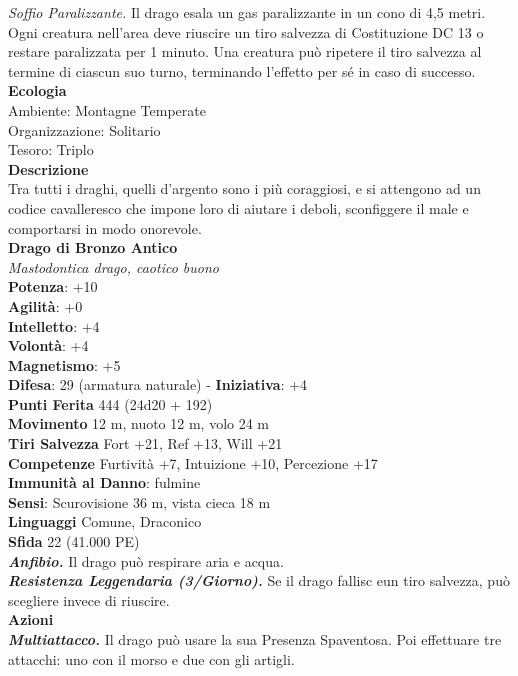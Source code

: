 \begin{multicols}{2}
\emph{Soffio Paralizzante.} Il drago esala un gas paralizzante in un cono di 4,5 metri. Ogni creatura nell'area deve riuscire un tiro salvezza di Costituzione DC 13 o restare paralizzata per 1 minuto. Una creatura può ripetere il tiro salvezza al termine di ciascun suo turno, terminando l'effetto per sé in caso di successo.\\
\textbf{Ecologia}\\
Ambiente: Montagne Temperate\\
Organizzazione: Solitario\\
Tesoro: Triplo\\
\textbf{Descrizione}\\
Tra tutti i draghi, quelli d’argento sono i più coraggiosi, e si attengono ad un codice cavalleresco che impone loro di aiutare i deboli, sconfiggere il male e comportarsi in modo onorevole.\\
\medskip\textbf{Drago di Bronzo Antico}\\
\emph{Mastodontica drago, caotico buono}\\
\textbf{Potenza}: +10\\
\textbf{Agilità}: +0\\
\textbf{Intelletto}: +4\\
\textbf{Volontà}: +4\\
\textbf{Magnetismo}: +5\\
\textbf{Difesa}: 29 (armatura naturale) - \textbf{Iniziativa}: +4\\
\textbf{Punti Ferita} 444 (24d20 + 192)\\
\textbf{Movimento} 12 m, nuoto 12 m, volo 24 m\\
\textbf{Tiri Salvezza} Fort +21, Ref +13, Will +21\\
\textbf{Competenze} Furtività +7, Intuizione +10, Percezione +17\\
\textbf{Immunità al Danno}: fulmine\\
\textbf{Sensi}: Scurovisione 36 m, vista cieca 18 m\\
\textbf{Linguaggi} Comune, Draconico\\
\textbf{Sfida} 22 (41.000 PE)\smallskip\\
\emph{\textbf{Anfibio.}} Il drago può respirare aria e acqua.\\
\emph{\textbf{Resistenza Leggendaria (3/Giorno).}} Se il drago fallisc eun tiro salvezza, può scegliere invece di riuscire. \\
\smallskip\textbf{Azioni}\\
\emph{\textbf{Multiattacco.}} Il drago può usare la sua Presenza Spaventosa. Poi effettuare tre attacchi: uno con il morso e due con gli artigli.\\

\end{multicols}
